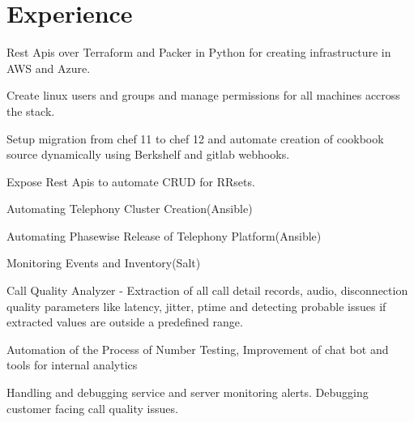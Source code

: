 \documentclass[]{deedy-resume-openfont}
\begin{document}
\begin{minipage}[t]{0.66\textwidth}


\section{Experience}

\vspace{\topsep} %
\begin{tightemize}
\item Rest Apis over Terraform and Packer in Python for creating infrastructure in AWS and Azure.
\item Create linux users and groups and manage permissions for all machines accross the stack.
\item Setup migration from chef 11 to chef 12 and automate creation of cookbook source dynamically using Berkshelf and gitlab webhooks.
\item Expose Rest Apis to automate CRUD for RRsets.
\end{tightemize}
\sectionsep

\begin{tightemize}
\item Automating Telephony Cluster Creation(Ansible)
\item Automating Phasewise Release of Telephony Platform(Ansible)
\item Monitoring Events and Inventory(Salt)
\end{tightemize}
\sectionsep

\begin{tightemize}
\item Call Quality Analyzer - Extraction of all call detail records, audio, disconnection quality parameters like latency, jitter, ptime and detecting probable issues if extracted values are outside a predefined range.
\item Automation of the Process of Number Testing, Improvement of  chat bot and tools for internal analytics
\item Handling and debugging service and server monitoring alerts. Debugging customer facing call quality issues.
\end{tightemize}
\sectionsep


\end{minipage}
\end{document}
